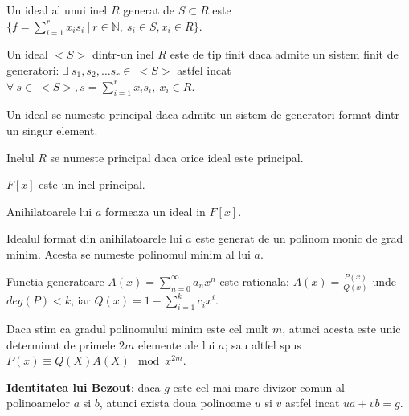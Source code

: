 \begin{defn}
  Un ideal al unui inel $R$ generat de $S \subset R$ este
  $\{f = \sum_{i=1}^{r} x_{i}s_{i} \ | \ r \in \mathbb{N}, \ s_{i} \in S, x_{i} \in R\}$.
\end{defn}

\begin{defn}
  Un ideal $<S>$ dintr-un inel $R$ este de tip finit daca admite un sistem finit de generatori:
  $\exists \ s_{1}, s_{2}, \ldots s_{r} \in \ <S>$  astfel incat
  $\forall \ s \in \ <S>, s = \sum_{i=1}^{r} x_{i} s_{i}, \ x_{i} \in R$.
\end{defn}

\begin{defn}
  Un ideal se numeste principal daca admite un sistem de generatori format
  dintr-un singur element.
\end{defn}

\begin{defn}
  Inelul $R$ se numeste principal daca orice ideal este principal.
\end{defn}

\begin{thm}
  $F[x]$ este un inel principal.
\end{thm}

\begin{lem}
  Anihilatoarele lui $a$ formeaza un ideal in $F[x]$.
\end{lem}

\begin{clr}
  Idealul format din anihilatoarele lui $a$ este generat de un polinom monic de
  grad minim. Acesta se numeste polinomul minim al lui $a$.
\end{clr}

\begin{thm}
  Functia generatoare $A(x) = \sum_{n=0}^{\infty} a_{n}x^{n}$ este rationala:
  $A(x) = \frac{P(x)}{Q(x)}$ unde $deg(P) < k$, iar $Q(x) = 1 - \sum_{i=1}^{k} c_{i}x^{i}$.
\end{thm}

\begin{thm}
  Daca stim ca gradul polinomului minim este cel mult $m$, atunci acesta este
  unic determinat de primele $2m$ elemente ale lui $a$; sau altfel spus
  $P(x) \equiv Q(X) A(X) \mod x^{2m}$.
\end{thm}

\textbf{Identitatea lui Bezout}: daca $g$ este cel mai mare divizor comun al
polinoamelor $a$ si $b$, atunci exista doua polinoame $u$ si $v$ astfel incat
$ua + vb = g$.

